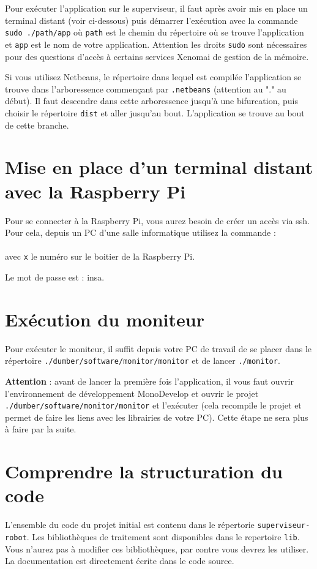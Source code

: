 \documentclass[11pt]{paper}
\newcommand{\raspi}{Raspberry Pi\xspace}
\begin{document}
Pour exécuter l'application sur le superviseur, il faut après avoir mis en place un terminal distant (voir ci-dessous) puis démarrer l'exécution avec la commande {\tt sudo ./path/app} où {\tt path} est le chemin du répertoire où se trouve l'application et {\tt app} est le nom de votre application. Attention les droits {\tt sudo} sont nécessaires pour des questions d'accès à certains services Xenomai de gestion de la mémoire.

Si vous utilisez Netbeans, le répertoire dans lequel est compilée l'application se trouve dans l'arboressence commençant par {\tt .netbeans} (attention au "." au début). Il faut descendre dans cette arboressence jusqu'à une bifurcation, puis choisir le répertoire {\tt dist} et aller jusqu'au bout. L'application se trouve au bout de cette branche.


\section{Mise en place d'un terminal distant avec la \raspi}
\label{sec:ssh}

Pour se connecter à la \raspi, vous aurez besoin de créer un accès via ssh. Pour cela, depuis un PC d'une salle informatique utilisez la commande :\\ \indent{}\\
avec {\tt x} le numéro sur le boitier de la \raspi.

Le mot de passe est : insa.


\section{Exécution du moniteur}
\label{sec:utilisation}

Pour exécuter le moniteur, il suffit depuis votre PC de travail de se placer dans le répertoire {\tt ./dumber/software/monitor/monitor} et de lancer {\tt ./monitor}.

{\bf Attention} : avant de lancer la première fois l'application, il vous faut ouvrir l'environnement de développement MonoDevelop et ouvrir le projet {\tt ./dumber/software/monitor/monitor}  et l'exécuter (cela recompile le projet et permet de faire les liens avec les librairies de votre PC). Cette étape ne sera plus à faire par la suite.


\section{Comprendre la structuration du code}
\label{sec:code}
 L'ensemble du code du projet initial est contenu dans le répertorie {\tt superviseur-robot}. Les bibliothèques de traitement sont disponibles dans le repertoire {\tt lib}. Vous n'aurez pas à modifier ces bibliothèques, par contre vous devrez les utiliser. La documentation est directement écrite dans le code source.
 
\end{document}
